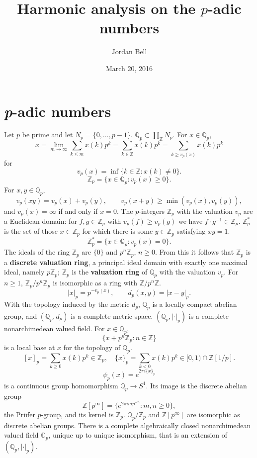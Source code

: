 \documentclass{article}
\theoremstyle{definition}
\begin{document}
\title{Harmonic analysis on the $p$-adic numbers}
\author{Jordan Bell}
\date{March 20, 2016}

\maketitle

\section{{\em p}-adic numbers}
Let $p$ be prime and let $N_p=\{0,\ldots,p-1\}$.
$\mathbb{Q}_p \subset \prod_{\mathbb{Z}} N_p$. For $x \in \mathbb{Q}_p$,
\[
x =\lim_{m \to \infty} \sum_{k \leq m} x(k) p^k = \sum_{k \in \mathbb{Z}} x(k) p^k = \sum_{k \geq v_p(x)} x(k) p^k
\]
for 
\[
v_p(x) = \inf\{k \in \mathbb{Z}: x(k) \neq 0\}.
\]
\[
\mathbb{Z}_p = \{x \in \mathbb{Q}_p: v_p(x) \geq 0\}.
\]
For $x,y \in \mathbb{Q}_p$,
\[
v_p(xy) = v_p(x)+v_p(y),\qquad v_p(x+y) \geq \min(v_p(x),v_p(y)),
\]
and $v_p(x)=\infty$ if and only if $x=0$. 
The $p$-integers $\mathbb{Z}_p$ with the valuation $v_p$
are a Euclidean domain:
for $f,g \in \mathbb{Z}_p$ with
$v_p(f) \geq v_p(g)$ we have $f\cdot g^{-1} \in \mathbb{Z}_p$.
$\mathbb{Z}_p^*$ is the set of those $x \in \mathbb{Z}_p$ for which there is some $y \in \mathbb{Z}_p$ satisfying $xy=1$.
\[
\mathbb{Z}_p^* = \{x \in \mathbb{Q}_p: v_p(x)=0\}.
\]
The ideals of the ring $\mathbb{Z}_p$ are $\{0\}$ and
$p^n\mathbb{Z}_p$, $n \geq 0$.
From this it follows that $\mathbb{Z}_p$ is a \textbf{discrete valuation ring}, a principal
ideal domain with exactly one maximal ideal, namely $p\mathbb{Z}_p$; $\mathbb{Z}_p$ is the \textbf{valuation ring} of $\mathbb{Q}_p$ with the valuation
$v_p$.
For $n \geq 1$,
$\mathbb{Z}_p/p^n \mathbb{Z}_p$ is isomorphic as a ring with
$\mathbb{Z}/p^n\mathbb{Z}$.
\[
|x|_p = p^{-v_p(x)},\qquad d_p(x,y) = |x-y|_p.
\]
With the topology induced by the metric $d_p$, $\mathbb{Q}_p$ is a locally compact abelian group,
and $(\mathbb{Q}_p,d_p)$ is a complete metric space.
$(\mathbb{Q}_p,|\cdot|_p)$ is a complete nonarchimedean valued field. 
For $x \in \mathbb{Q}_p$,
\[
\{x+p^n \mathbb{Z}_p: n \in \mathbb{Z}\} 
\]
is a local base at $x$ for the topology of $\mathbb{Q}_p$. 
\[
[x]_p = \sum_{k \geq 0} x(k) p^k \in \mathbb{Z}_p,\quad \{x\}_p = \sum_{k<0} x(k) p^k \in [0,1) \cap \mathbb{Z}[1/p].
\]
\[
\psi_p(x) = e^{2\pi i\{x\}_p}
\]
is a continuous group homomorphism $\mathbb{Q}_p \to S^1$. Its image is the discrete abelian group
\[
\mathbb{Z}[p^\infty] = \{e^{2\pi imp^{-n}}: m,n \geq 0\},
\]
the Pr\"ufer $p$-group,
and its kernel is
$\mathbb{Z}_p$. $\mathbb{Q}_p / \mathbb{Z}_p$ and $\mathbb{Z}[p^\infty]$ are isomorphic as discrete abelian groups.
There is a complete algebraically closed nonarchimedean valued field $\mathbb{C}_p$, unique up to unique
isomorphism, that is an extension of $(\mathbb{Q}_p,|\cdot|_p)$. 
\end{document}
